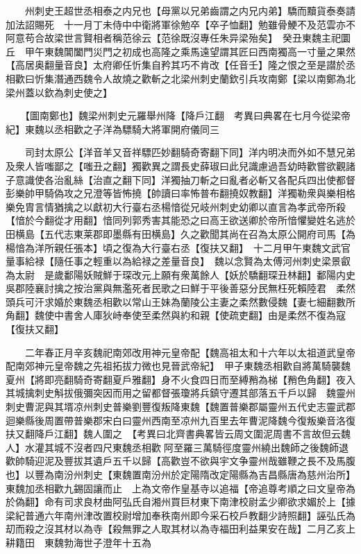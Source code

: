 　　州刺史王超世丞相泰之内兄也【母黨以兄弟齒謂之内兄内弟】驕而黷貨泰奏請加法詔賜死　十一月丁未侍中中衛將軍徐勉卒【卒子恤翻】勉雖骨鯁不及范雲亦不阿意苟合故梁世言賢相者稱范徐云【范徐既沒專任朱异梁殆矣】　癸丑東魏主祀圜丘　甲午東魏閶闔門災門之初成也高隆之乘馬遠望謂其匠曰西南獨高一寸量之果然【高居奥翻量音良】太府卿任忻集自矜其巧不肯改【任音壬】隆之恨之至是譛於丞相歡曰忻集潛通西魏令人故燒之歡斬之北梁州刺史蘭欽引兵攻南鄭【梁以南鄭為北梁州蓋以欽為刺史使之】

　　【圖南鄭也】魏梁州刺史元羅舉州降【降戶江翻　考異曰典畧在七月今從梁帝紀】東魏以丞相歡之子洋為驃騎大將軍開府儀同三

　　司封太原公【洋音羊又音祥驃匹妙翻騎奇寄翻下同】洋内明决而外如不慧兄弟及衆人皆嗤鄙之【嗤丑之翻】獨歡異之謂長史薛琡曰此兒識慮過吾幼時歡嘗欲觀諸子意識使各治亂絲【治直之翻下同】洋獨抽刀斬之曰亂者必斬又各配兵四出使都督彭樂帥甲騎偽攻之兄澄等皆怖撓【帥讀曰率怖普布翻撓奴教翻】洋獨勒衆與樂相格樂免胄言情猶擒之以獻初大行臺右丞楊愔從兄岐州刺史幼卿以直言為孝武帝所殺【愔於今翻從才用翻】愔同列郭秀害其能恐之曰高王欲送卿於帝所愔懼變姓名逃於田横島【五代志東莱郡即墨縣有田横島】久之歡聞其尚在召為太原公開府司馬【為楊愔為洋所親任張本】頃之復為大行臺右丞【復扶又翻】　十二月甲午東魏文武官量事給禄【隨任事之輕重以為給禄之差量音良】　魏以念賢為太傅河州刺史梁景叡為太尉　是歲鄱陽妖賊鮮于琛改元上願有衆萬餘人【妖於驕翻琛丑林翻】鄱陽内史吳郡陸襄討擒之按治黨與無濫死者民歌之曰鮮于平後善惡分民無枉死賴陸君　柔然頭兵可汗求婚於東魏丞相歡以常山王妹為蘭陵公主妻之柔然數侵魏【妻七細翻數所角翻】魏使中書舍人庫狄峙奉使至柔然與約和親【使疏吏翻】由是柔然不復為寇【復扶又翻】

　　二年春正月辛亥魏祀南郊改用神元皇帝配【魏高祖太和十六年以太祖道武皇帝配南郊神元皇帝魏之先祖拓拔力微也見晉武帝紀】　甲子東魏丞相歡自將萬騎襲魏夏州【將即亮翻騎奇寄翻夏戶雅翻】身不火食四日而至縛矟為梯【矟色角翻】夜入其城擒刺史斛拔俄彌突因而用之留都督張瓊將兵鎮守遷其部落五千戶以歸　魏靈州刺史曹泥與其壻凉州刺史普樂劉豐復叛降東魏【魏置普樂郡屬靈州五代史志靈武郡迴樂縣後周置帶普樂郡宋白曰靈州西南至凉州九百里去年曹泥降魏今復叛樂音洛復扶又翻降戶江翻】魏人圍之　【考異曰北齊書典畧皆云周文圍泥周書不言故但云魏人】水灌其城不沒者四尺東魏丞相歡阿至羅三萬騎徑度靈州繞出魏師之後魏師退歡帥騎迎泥及豐拔其遺戶五千以歸【高歡豈不欲與宇文争靈州哉雖鞭之長不及馬腹也】以豐為南汾州刺史【東魏置南汾州於定陽隋改定陽縣為吉昌縣唐為慈州治所】　東魏加丞相歡九錫固讓而止　上為文帝作皇基寺以追福【帝追尊考順之曰文皇帝為於偽翻】命有司求良材曲阿弘氏自湘州買巨材東下南津校尉孟少卿欲求媚於上【據梁紀普通六年南州津改置校尉增加奉秩南州即今采石校戶教翻少詩照翻】誣弘氏為刧而殺之沒其材以為寺【殺無罪之人取其材以為寺福田利益果安在哉】二月乙亥上耕籍田　東魏勃海世子澄年十五為

